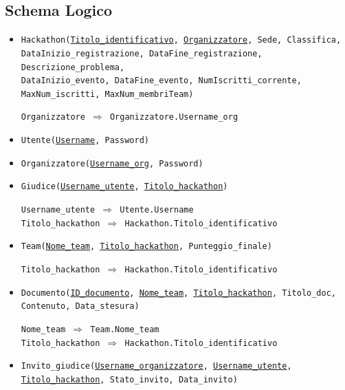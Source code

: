 \documentclass[a4paper, 10pt]{article}
\begin{document}
	\subsection{Schema Logico}
	\begin{itemize}
		\item \texttt{Hackathon(\underline{Titolo\_identificativo}, \underline{\underline{Organizzatore}}, Sede, Classifica,\\
			DataInizio\_registrazione, DataFine\_registrazione, Descrizione\_problema, 
			\\DataInizio\_evento, DataFine\_evento, NumIscritti\_corrente, MaxNum\_iscritti, MaxNum\_membriTeam)}
		\begin{graybox}
			\texttt{Organizzatore $\Rightarrow$ Organizzatore.Username\_org}
		\end{graybox}
		\item \texttt{Utente(\underline{Username}, Password)}
		\item \texttt{Organizzatore(\underline{Username\_org}, Password)}
		\item \texttt{Giudice(\underline{\underline{Username\_utente}}, \underline{\underline{Titolo\_hackathon}})}
		\begin{graybox}
			\texttt{Username\_utente $\Rightarrow$ Utente.Username}\\
			\texttt{Titolo\_hackathon $\Rightarrow$ Hackathon.Titolo\_identificativo}
		\end{graybox}
		\item \texttt{Team(\underline{Nome\_team}, \underline{\underline{Titolo\_hackathon}}, Punteggio\_finale)}
		\begin{graybox}
			\texttt{Titolo\_hackathon $\Rightarrow$ Hackathon.Titolo\_identificativo}
		\end{graybox}
		\item \texttt{Documento(\underline{ID\_documento}, \underline{\underline{Nome\_team}}, \underline{\underline{Titolo\_hackathon}}, Titolo\_doc,\\Contenuto, Data\_stesura)}
		\begin{graybox}
			\texttt{Nome\_team $\Rightarrow$ Team.Nome\_team}\\
			\texttt{Titolo\_hackathon $\Rightarrow$ Hackathon.Titolo\_identificativo}
		\end{graybox}
		\item \texttt{Invito\_giudice(\underline{\underline{Username\_organizzatore}}, \underline{\underline{Username\_utente}}, \underline{\underline{Titolo\_hackathon}}, Stato\_invito, Data\_invito)}

\end{itemize}
\end{document}
